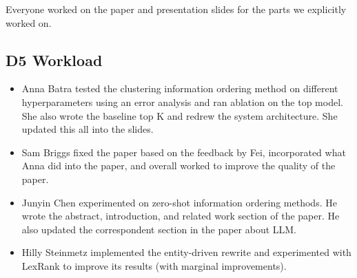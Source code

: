 Everyone worked on the paper and presentation slides for the parts we explicitly worked on.

\subsection{D5 Workload}

\begin{itemize}
    \item Anna Batra tested the clustering information ordering method on different hyperparameters using an error analysis and ran ablation on the top model. She also wrote the baseline top K and redrew the system architecture. She updated this all into the slides.

    \item Sam Briggs fixed the paper based on the feedback by Fei, incorporated what Anna did into the paper, and overall worked to improve the quality of the paper.

    \item Junyin Chen experimented on zero-shot information ordering methods. He wrote the abstract, introduction, and related work section of the paper. He also updated the correspondent section in the paper about LLM.

    \item Hilly Steinmetz implemented the entity-driven rewrite and experimented with LexRank to improve its results (with marginal improvements).
    
\end{itemize}